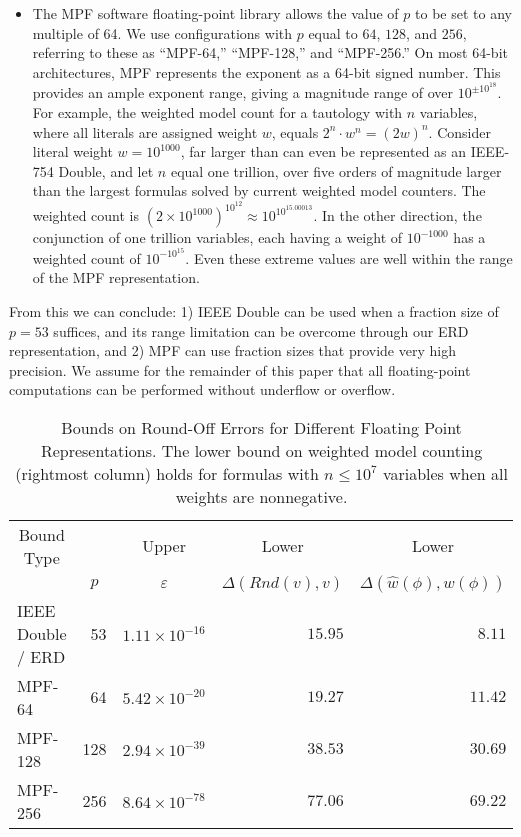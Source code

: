 \documentclass{easychair}
\newcommand{\approximate}[1]{\hat{#1}}
\newcommand{\approxw}{\approximate{w}}
\newcommand{\round}{\mathit{Rnd}}
\newcommand{\digitprecision}{\Delta}
\newcommand{\roundepsilon}{\varepsilon}
\begin{document}
\begin{itemize}
\item The MPF software floating-point library allows the value of $p$
  to be set to any multiple of 64.  We use configurations with $p$ equal to $64$, $128$, and $256$,
  referring to these as ``MPF-64,'' ``MPF-128,'' and ``MPF-256.'' On
  most 64-bit architectures, MPF represents the exponent as a 64-bit
  signed number.  This provides an ample exponent range, giving a
  magnitude range of over $10^{\pm 10^{18}}$.
  For example, the weighted model count for a tautology with $n$ variables,
  where all literals are assigned weight $w$, equals
  $2^n\cdot w^n = (2w)^n$.  Consider literal weight $w=10^{1000}$,
 far larger than can even be represented as an IEEE-754 Double, and let $n$ equal one trillion, over five orders of magnitude
 larger than the largest formulas solved by current weighted model counters.  The weighted count is
 $(2 \times 10^{1000})^{10^{12}} \approx 10^{10^{15.00013}}$.  In the other direction, the conjunction of one trillion variables, each having a weight
 of $10^{-1000}$ has a weighted count of $10^{-10^{15}}$.  Even these extreme values are
 well within the range of the MPF representation.
\end{itemize}

From this we can conclude: 1) IEEE Double can be used when a
fraction size of $p=53$ suffices, and its range limitation can be overcome
through our ERD representation,
and 2) MPF can use fraction sizes that provide very high precision.  We
assume for the remainder of this paper that all floating-point
computations can be performed without underflow or overflow.

\begin{table}
  \caption{Bounds on Round-Off Errors for Different Floating Point Representations.  The lower bound on
  weighted model counting (rightmost column) holds for formulas with $n \leq 10^{7}$ variables when all weights are nonnegative.}
  \label{tab:precision}
  \begin{center}
  \begin{tabular}{lrrrr}
    \toprule
    \multicolumn{1}{c}{Bound Type} & & \multicolumn{1}{c}{Upper} & \multicolumn{1}{c}{Lower} & \multicolumn{1}{c}{Lower} \\
    \multicolumn{1}{c}{} & \multicolumn{1}{c}{$p$} & \multicolumn{1}{c}{$\roundepsilon$} & \multicolumn{1}{c}{$\digitprecision(\round(v), v)$} & \multicolumn{1}{c}{$\digitprecision(\approxw(\phi), w(\phi))$} \\
    \midrule
    IEEE Double / ERD &  53 & $1.11 \times 10^{-16}$ & $15.95$    & $8.11$ \\
    MPF-64      &  64 & $5.42 \times 10^{-20}$   & $19.27$  & $11.42$ \\
    MPF-128      &  128 & $2.94 \times 10^{-39}$ &  $38.53$ & $30.69$  \\
    MPF-256      &  256 & $8.64 \times 10^{-78}$ & $77.06$ & $69.22$ \\
    \bottomrule
  \end{tabular}
  \end{center}
\end{table}
\end{document}
